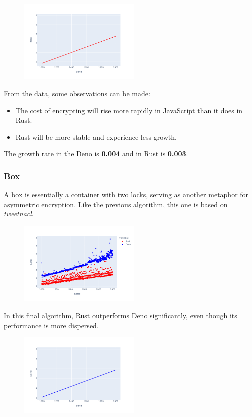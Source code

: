 \documentclass[10pt,journal,compsoc]{IEEEtran}
\begin{document}
\begin{figure}[H]
    \centering
    \includegraphics[width=0.52\textwidth]{images/trend_secretbox_rust}
\end{figure}

From the data, some observations can be made:
\begin{itemize}
    \item The cost of encrypting will rise more rapidly in JavaScript than it does in Rust.
    \item Rust will be more stable and experience less growth.
\end{itemize}

The growth rate in the Deno is \textbf{0.004} and in Rust is \textbf{0.003}.

\subsubsection{Box}

A box is essentially a container with two locks, serving as another metaphor for asymmetric encryption. Like the previous algorithm, this one is based on \textit{tweetnacl}.

\begin{figure}[H]
    \centering
    \includegraphics[width=0.52\textwidth]{images/box_lines}
\end{figure}

In this final algorithm, Rust outperforms Deno significantly, even though its performance is more dispersed.

\begin{figure}[H]
    \centering
    \includegraphics[width=0.52\textwidth]{trend_box_deno}
\end{figure}
\end{document}
